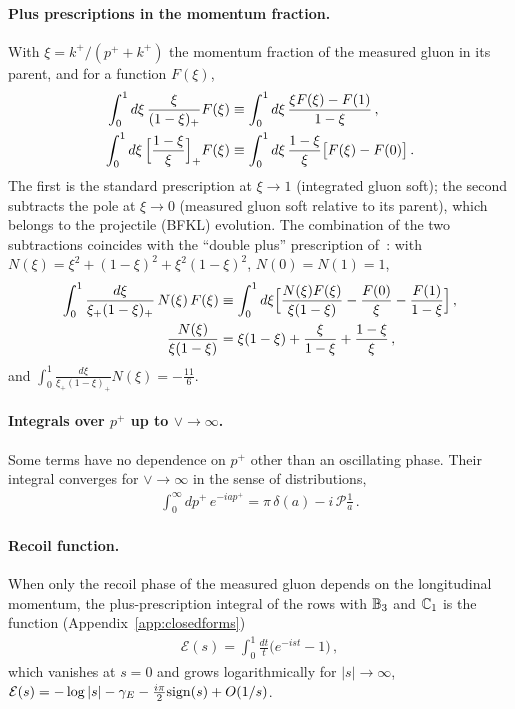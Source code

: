 \paragraph{Plus prescriptions in the momentum fraction.} With $\xi=k^+/(p^++k^+)$ the momentum fraction of the measured gluon in its parent, and for a function $F(\xi)$,
\begin{align}\label{eq:plusxi}
\int_0^1d\xi\,\frac{\xi}{(1-\xi)_+}F(\xi)&\equiv\int_0^1d\xi\,\frac{\xi F(\xi)-F(1)}{1-\xi}\,,\notag\\
\int_0^1d\xi\,\Big[\frac{1-\xi}{\xi}\Big]_+F(\xi)&\equiv\int_0^1d\xi\,\frac{1-\xi}{\xi}\big[F(\xi)-F(0)\big]\,.
\end{align}
The first is the standard prescription at $\xi\to1$ (integrated gluon soft); the second subtracts the pole at $\xi\to0$ (measured gluon soft relative to its parent), which belongs to the projectile (BFKL) evolution. The combination of the two subtractions coincides with the ``double plus'' prescription of~\cite{Kovner:2023vsy}: with $N(\xi)=\xi^2+(1-\xi)^2+\xi^2(1-\xi)^2$, $N(0)=N(1)=1$,
\begin{align}
\int_0^1\frac{d\xi}{\xi_+(1-\xi)_+}\,N(\xi)\,F(\xi)&\equiv\int_0^1d\xi\Big[\frac{N(\xi)F(\xi)}{\xi(1-\xi)}-\frac{F(0)}{\xi}-\frac{F(1)}{1-\xi}\Big]\,,\notag\\
\frac{N(\xi)}{\xi(1-\xi)}&=\xi(1-\xi)+\frac{\xi}{1-\xi}+\frac{1-\xi}{\xi}\,,
\end{align}
and $\int_0^1\frac{d\xi}{\xi_+(1-\xi)_+}N(\xi)=-\frac{11}{6}$.

\paragraph{Integrals over $p^+$ up to $\vee\to\infty$.} Some terms have no dependence on $p^+$ other than an oscillating phase. Their integral converges for $\vee\to\infty$ in the sense of distributions,
\begin{align}\label{eq:distrib}
\int_0^\infty dp^+\,e^{-iap^+}=\pi\,\delta(a)-i\,\mathcal P\frac1a\,.
\end{align}

\paragraph{Recoil function.} When only the recoil phase of the measured gluon depends on the longitudinal momentum, the plus-prescription integral of the rows with $\mathbb{B}_3$ and $\mathbb{C}_1$ is the function (Appendix~\ref{app:closedforms})
\begin{align}\label{eq:Erecoil}
\mathcal E(s)=\int_0^1\frac{dt}{t}\big(e^{-ist}-1\big)\,,
\end{align}
which vanishes at $s=0$ and grows logarithmically for $|s|\to\infty$, $\mathcal E(s)=-\log|s|-\gamma_E-\frac{i\pi}{2}{\rm sign}(s)+O(1/s)$.

